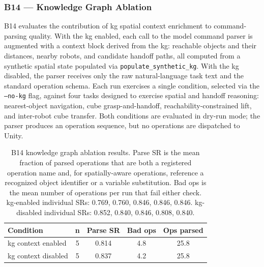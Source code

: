 \documentclass[
     12pt,
     a4paper,
     BCOR=10mm,
     DIV=14,
     listof=totoc,
     bibliography=totoc,
     parskip,
     twoside,
     headsepline
     ]{scrreprt}
\begin{document}
\subsubsection{B14 --- Knowledge Graph Ablation}\label{sec:results-kg}
B14 evaluates the contribution of \gls{kg} spatial context enrichment to command-parsing quality. With the \gls{kg} enabled, each call to the model command parser is augmented with a context block derived from the \gls{kg}: reachable objects and their distances, nearby robots, and candidate handoff paths, all computed from a synthetic spatial state populated via \texttt{populate\_synthetic\_kg}. With the \gls{kg} disabled, the parser receives only the raw natural-language task text and the standard operation schema. Each run exercises a single condition, selected via the \texttt{--no-kg} flag, against four tasks designed to exercise spatial and handoff reasoning: nearest-object navigation, cube grasp-and-handoff, reachability-constrained lift, and inter-robot cube transfer. Both conditions are evaluated in dry-run mode; the parser produces an operation sequence, but no operations are dispatched to Unity.

\begin{table}[ht]
	\centering
	\begin{tabular}{lcccc}
		\hline
		\textbf{Condition}        & \textbf{n}          & \textbf{Parse SR} &
		\textbf{Bad ops}          & \textbf{Ops parsed}                                  \\
		\hline
		\gls{kg} context enabled  & 5                   & 0.814             & 4.8 & 25.8 \\
		\gls{kg} context disabled & 5                   & 0.837             & 4.2 & 25.8 \\
		\hline
	\end{tabular}
	\caption{B14 knowledge graph ablation results. Parse SR is the mean fraction of parsed operations that are both a registered operation name and, for spatially-aware operations, reference a recognized object identifier or a variable substitution. Bad ops is the mean number of operations per run that fail either check. \gls{kg}-enabled individual SRs: 0.769, 0.760, 0.846, 0.846, 0.846. \gls{kg}-disabled individual SRs: 0.852, 0.840, 0.846, 0.808, 0.840.}
	\label{tab:b14-results}
\end{table}
\end{document}
